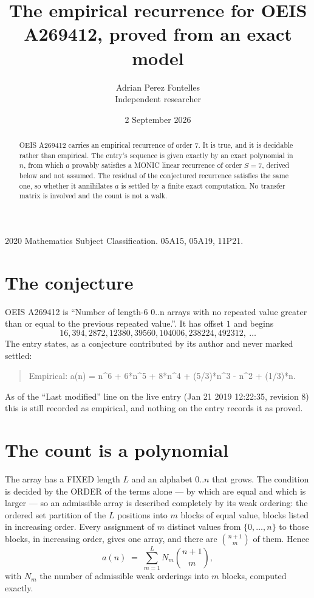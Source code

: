 \documentclass[11pt,a4paper]{article}
\title{The empirical recurrence for OEIS A269412, proved from an exact model}
\author{Adrian Perez Fontelles\\ \small Independent researcher}
\date{2 September 2026}
\theoremstyle{plain}
\theoremstyle{definition}
\begin{document}
\maketitle

\begin{abstract}
OEIS A269412 carries an empirical recurrence of order $7$. It is true, and it is
decidable rather than empirical. The entry's sequence is given exactly by an exact polynomial in $n$, from
which $a$ provably satisfies a MONIC linear recurrence of order $S=7$, derived below and not
assumed. The residual of the conjectured recurrence satisfies the same one, so whether it
annihilates $a$ is settled by a finite exact computation. No transfer matrix is involved and
the count is not a walk.
\end{abstract}

\noindent\small 2020 Mathematics Subject Classification. 05A15, 05A19, 11P21.\normalsize

\section{The conjecture}

OEIS A269412 is ``Number of length-6 0..n arrays with no repeated value greater than or equal to the previous repeated value.''. It has offset $1$ and begins
\[
16, 394, 2872, 12380, 39560, 104006, 238224, 492312,\ \dots
\]
The entry states, as a conjecture contributed by its author and never marked settled:
\begin{quote}
Empirical: a(n) = n\^{}6 + 6*n\^{}5 + 8*n\^{}4 + (5/3)*n\^{}3 - n\^{}2 + (1/3)*n.
\end{quote}
As of the ``Last modified'' line on the live entry (Jan 21 2019 12:22:35, revision 8)
this is still recorded as empirical, and nothing on the entry records it as proved.

\section{The count is a polynomial}

The array has a FIXED length $L$ and an alphabet $0..n$ that grows. The condition is decided by
the ORDER of the terms alone --- by which are equal and which is larger --- so an admissible
array is described completely by its weak ordering: the ordered set partition of the $L$
positions into $m$ blocks of equal value, blocks listed in increasing order. Every assignment
of $m$ distinct values from $\{0,\dots,n\}$ to those blocks, in increasing order, gives one
array, and there are $\binom{n+1}{m}$ of them. Hence
\[
a(n)\;=\;\sum_{m=1}^{L} N_m\binom{n+1}{m},
\]
with $N_m$ the number of admissible weak orderings into $m$ blocks, computed exactly.
\end{document}
